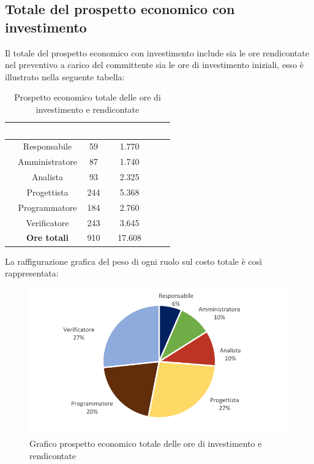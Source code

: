 \subsection{Totale del prospetto economico con investimento}
Il totale del prospetto economico con investimento include sia le ore rendicontate nel preventivo a carico del committente sia  le ore  di investimento iniziali, esso è illustrato nella seguente tabella:

\begin{table}[ht]
	\begin{center}
		\begin{tabular}{cccccc}
			\rowcolor{coolblack}
			\hline
			&\textcolor{white}{Ruolo}&	\textcolor{white}{Ore} &\textcolor{white}{Costo(\euro)} \\
			\hline
			&Responsabile           &59&1.770\\
			&Amministratore        & 87& 1.740 \\
			&Analista                   & 93& 2.325\\
			&Progettista              &  244& 5.368\\
			&Programmatore       & 184& 2.760 \\
			&Verificatore             & 243& 3.645\\
			\hline
			&\textbf{Ore totali}    &910&17.608\\
		\end{tabular}
		\caption{Prospetto economico totale delle ore di investimento e rendicontate}
	\end{center}
\end{table}

La raffigurazione grafica del peso di ogni ruolo sul costo totale è così rappresentata:
\begin{figure}[!ht]
	\begin{center}
		\includegraphics{images/grafoOreInvestimentoEuro.png}
		\caption{Grafico prospetto economico totale delle ore di investimento e rendicontate}
	\end{center}
\end{figure}



